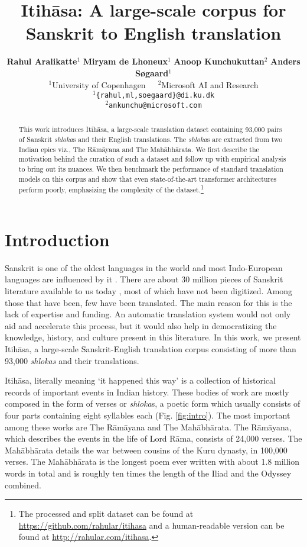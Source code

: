 \documentclass[11pt,a4paper]{article}
\title{Itih\={a}sa: A large-scale corpus for Sanskrit to English translation}
\author{\textbf{Rahul Aralikatte}$^{1}$ \textbf{Miryam de Lhoneux}$^{1}$ \textbf{Anoop Kunchukuttan}$^{2}$ \textbf{Anders Søgaard}$^{1}$ \\   
    $^1$University of Copenhagen~~~$^2$Microsoft AI and Research \\
    $^1${\tt \{rahul,ml,soegaard\}@di.ku.dk} \\
    $^2${\tt ankunchu@microsoft.com} \\
}
\newcommand\itihasa{Itih\={a}sa\xspace}
\newcommand\ramayana{The R\={a}m\={a}yana\xspace}
\newcommand\mahabharata{The Mah\={a}bh\={a}rata\xspace}
\begin{document}
\maketitle

\begin{abstract}
This work introduces \itihasa, a large-scale translation dataset containing 93,000 pairs of Sanskrit {\it shloka}s and their English translations. The {\it shloka}s are extracted from two Indian epics viz., \ramayana and \mahabharata. We first describe the motivation behind the curation of such a dataset and follow up with empirical analysis to bring out its nuances. We then benchmark the performance of standard translation models on this corpus and show that even state-of-the-art transformer architectures perform poorly, emphasizing the complexity of the dataset.\footnote{The processed and split dataset can be found at \url{https://github.com/rahular/itihasa} and a human-readable version can be found at \url{http://rahular.com/itihasa}.}
\end{abstract}

\section{Introduction}

Sanskrit is one of the oldest languages in the world and most Indo-European languages are influenced by it \cite{sanskit-influence}. There are about 30 million pieces of Sanskrit literature available to us today \cite{goyal-etal-30mil}, most of which have not been digitized. Among those that have been, few have been translated. The main reason for this is the lack of expertise and funding. An automatic translation system would not only aid and accelerate this process, but it would also help in democratizing the knowledge, history, and culture present in this literature. In this work, we present \itihasa, a large-scale Sanskrit-English translation corpus consisting of more than 93,000 {\it shlokas} and their translations.

\itihasa, literally meaning `it happened this way' is a collection of historical records of important events in Indian history. These bodies of work are mostly composed in the form of verses or {\it shloka}s, a poetic form which usually consists of four parts containing eight syllables each (Fig. \ref{fig:intro}). The most important among these works are \ramayana and \mahabharata. \ramayana, which describes the events in the life of Lord R\={a}ma, consists of 24,000 verses. \mahabharata details the war between cousins of the Kuru dynasty, in 100,000  verses. \mahabharata is the longest poem ever written with about 1.8 million words in total and is roughly ten times the length of the Iliad and the Odyssey combined.
\end{document}

